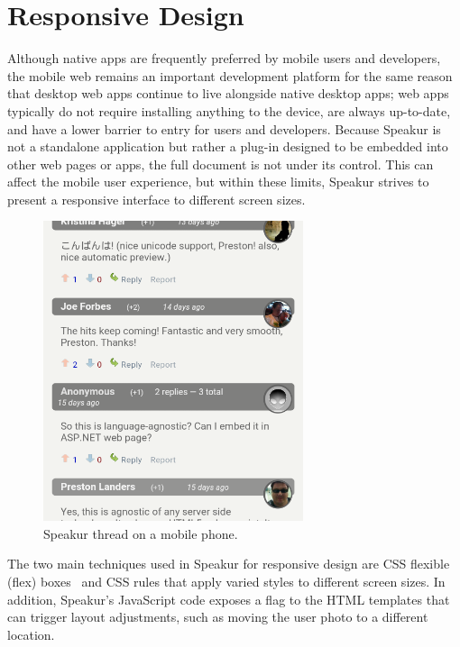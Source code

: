 \section{Responsive Design}
\label{bg:mobile}
Although native apps are frequently preferred by mobile users and developers, 
the mobile web remains an important development platform for the same reason that 
desktop web apps continue to live alongside native desktop apps; 
web apps typically do not require installing anything to the device, are always up-to-date, and have a lower barrier to entry for users and developers.
Because Speakur is not a standalone application but rather a plug-in designed to be embedded into other web pages or apps, 
the full document is not under its control.
This can affect the mobile user experience,
but within these limits, Speakur strives to present a responsive interface to different screen sizes.

\begin{figure}[htb]
\centering
 \includegraphics[width=3in]{images/mobile2.png}
\caption{Speakur thread on a mobile phone.}
\label{f:mobile1}
\end{figure}

The two main techniques used in Speakur for responsive design are CSS flexible (flex) boxes~\cite{mozillacontributors2015} 
and CSS  rules that apply varied styles to different screen sizes. 
In addition, Speakur's JavaScript code exposes a  flag to the HTML templates that can trigger layout adjustments, 
such as moving the user photo to a different location.

